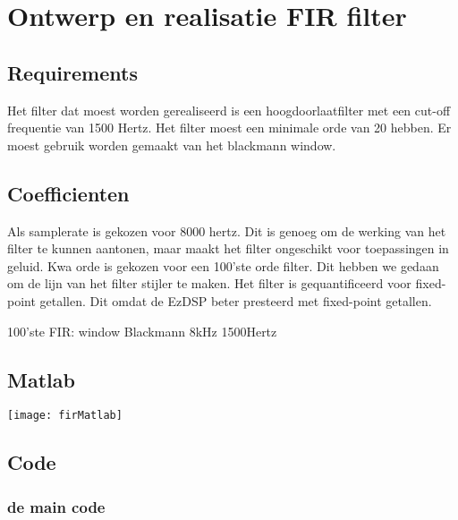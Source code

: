\section{Ontwerp en realisatie FIR filter}

\subsection{Requirements}
Het filter dat moest worden gerealiseerd is een hoogdoorlaatfilter met een cut-off frequentie van 1500 Hertz. 
Het filter moest een minimale orde van 20 hebben. Er moest gebruik worden gemaakt van het blackmann window.

\subsection{Coefficienten}
Als samplerate is gekozen voor 8000 hertz. Dit is genoeg om de werking van het filter te kunnen aantonen, maar maakt het filter ongeschikt voor toepassingen in geluid. 
Kwa orde is gekozen voor een 100'ste orde filter. Dit hebben we gedaan om de lijn van het filter stijler te maken.
Het filter is gequantificeerd voor fixed-point getallen. Dit omdat de EzDSP beter presteerd met fixed-point getallen.


    \begin{enumerate}[label=\emph{\alph*)}]
         100'ste
         FIR: window
         Blackmann
         8kHz
         1500Hertz
    \end{enumerate}

    \subsection{Matlab}
    
    \texttt{[image: firMatlab]}\par\vspace{1cm}
    \clearpage
    \subsection{Code}

    \subsubsection{de main code}
        
